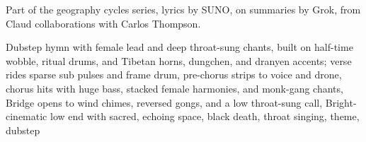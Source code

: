 
\begin{notes}
Part of the geography cycles series, lyrics by SUNO, on summaries by Grok, from Claud collaborations with Carlos Thompson.
\end{notes}
\begin{style}
Dubstep hymn with female lead and deep throat-sung chants, built on half-time wobble, ritual drums, and Tibetan horns, dungchen, and dranyen accents; verse rides sparse sub pulses and frame drum, pre-chorus strips to voice and drone, chorus hits with huge bass, stacked female harmonies, and monk-gang chants, Bridge opens to wind chimes, reversed gongs, and a low throat-sung call, Bright-cinematic low end with sacred, echoing space, black death, throat singing, theme, dubstep
\end{style}
